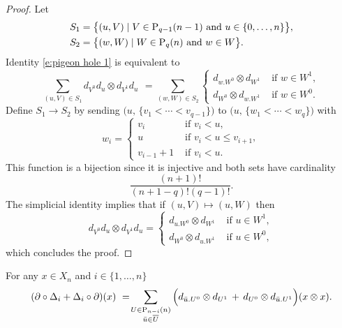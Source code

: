 \begin{proof}
	Let
	\begin{align*}
	& S_1 = \big\{ (u, V)\mid V \in \P_{q-1}(n-1) \text{ and } u \in \{0,\dots,n\} \big\}, \\
	& S_2 = \big\{ (w, W)\mid W \in \P_{q}(n) \text{ and } w \in W \big\}.
	\end{align*}
	Identity \eqref{e:pigeon hole 1} is equivalent to
	\begin{equation} \label{e:pigeon hole 2}
	\sum_{(u, V) \in S_1} d_{V^0}d_u \otimes d_{V^1}d_u \ \, = \!
	\sum_{(w, W) \in S_2} 
	\begin{cases}
	d_{w.W^0} \otimes d_{W^1} & \text{ if } w \in W^1, \\
	d_{W^0} \otimes d_{w.W^1} & \text{ if } w \in W^0.
	\end{cases}
	\end{equation}	
	Define $S_1 \to S_2$ by sending $\big(u,\, \{v_1 < \cdots < v_{q-1}\} \big)$ to $\big(u,\, \{w_1 < \cdots < w_{q}\} \big)$ with
	\begin{equation*}
	w_i = 
	\begin{cases}
	v_i & \text{ if } v_i < u, \\
	u & \text{ if } v_i < u \leq v_{i+1}, \\
	v_{i-1}+1 & \text{ if } v_i < u.
	\end{cases}
	\end{equation*} 
	This function is a bijection since it is injective and both sets have cardinality 
	\begin{equation*}
	\frac{(n+1)!}{(n+1-q)!(q-1)!}.
	\end{equation*}
	The simplicial identity implies that if $(u, V) \mapsto (u, W)$ then
	\begin{equation*}
	d_{V^0}d_u \otimes d_{V^1}d_u =
	\begin{cases}
	d_{u.W^0} \otimes d_{W^1} & \text{ if } u \in W^1, \\
	d_{W^0} \otimes d_{u.W^1} & \text{ if } u \in W^0,
	\end{cases}
	\end{equation*}
	which concludes the proof.
\end{proof}

\begin{lemma} \label{l:boundary of Delta}
	For any $x \in X_n$ and $i \in \{1, \dots, n\}$
	\begin{equation} \label{e:boundary of Delta}
	(\partial \circ \Delta_i + \Delta_i \circ \partial)(x) \ = \! 
	\sum_{\substack{U \in \P_{n-i}(n) \\ \bu \in \overline{U}}} \Big( d_{\bu.U^0} \otimes d_{U^1} \, + \, d_{U^0} \otimes d_{\bu.U^1} \Big) (x \otimes x).
	\end{equation}
\end{lemma}

